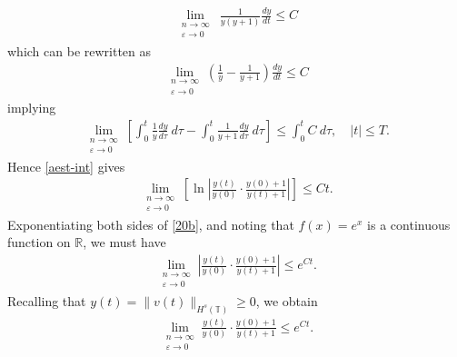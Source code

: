 \documentclass[12pt,reqno]{amsart}
\newcommand{\rr}{\mathbb{R}}
\newcommand{\ci}{\mathbb{T}}
\newcommand{\ee}{\varepsilon}
\theoremstyle{plain}  %
\theoremstyle{definition}
\begin{document}
\begin{appendices}
\begin{equation*}
	\begin{split}
		\lim_{\substack{n \to \infty \\ \ee \to 0} } \ \frac{1}{y(y+1)} \frac{dy}{dt}
		\le	C
	\end{split}
\end{equation*}
which can be rewritten as
\begin{equation*}
	\begin{split}
		\lim_{\substack{n \to \infty \\ \ee \to 0} }
		\left( \frac{1}{y} - \frac{1}{y+1} \right)\frac{dy}{dt} \le C 
	\end{split}
\end{equation*}
implying
\begin{equation}
	\label{aest-int}
	\begin{split}
		\lim_{\substack{n \to \infty \\ \ee \to 0} } \left [
\int_0^t \frac{1}{y} \frac{dy}{d \tau} \ d \tau
		- \int_0^t \frac{1}{y+1} \frac{dy}{d \tau} \ d \tau \right ]
		\le \int_0^t C \ d \tau, \quad |t| \le T.
	\end{split}
\end{equation}
Hence \eqref{aest-int} gives 
\begin{equation}
	\begin{split}
	\lim_{\substack{n \to \infty \\ \ee \to 0} }	\left [ \ln \left | \frac{y(t)}{y(0)}
	\cdot \frac{y(0) + 1}{y(t) + 1} \right | \right ] \le C t.
		\label{20b}
	\end{split}
\end{equation}
Exponentiating both sides of \eqref{20b}, and noting that $f(x) = e^x$
is a continuous function on $\rr$, we must have
\begin{equation*}
	\begin{split}
		\lim_{\substack{n \to \infty \\ \ee \to 0} }	
		\left |
		\frac{y(t)}{y(0)} \cdot \frac{y(0) + 1}{y(t) + 1} \right | \le e^{C t}.
	\end{split}
\end{equation*}
Recalling that $y(t) = \|v(t)\|_{H^s(\ci)} \ge 0$, we obtain
\begin{equation*}
	\begin{split}
		\lim_{\substack{n \to \infty \\ \ee \to 0} }	
		\frac{y(t)}{y(0)} \cdot \frac{y(0) + 1}{y(t) + 1} \le e^{C t}.
	\end{split}
\end{equation*}

\end{appendices}
\end{document}
